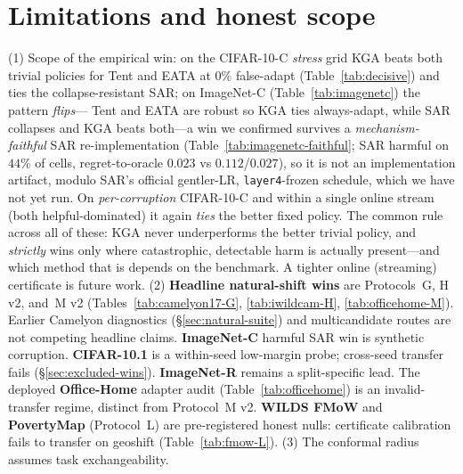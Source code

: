 \documentclass[conference]{IEEEtran}
\theoremstyle{plain}
\theoremstyle{definition}
\begin{document}
\section{Limitations and honest scope}\label{sec:limits}
\begin{center}
\end{center}

\medskip
(1) Scope of the empirical win: on the CIFAR-10-C \emph{stress} grid \textsc{KGA} beats both
trivial policies for Tent and EATA at $0\%$ false-adapt (Table~\ref{tab:decisive}) and ties
the collapse-resistant SAR; on ImageNet-C (Table~\ref{tab:imagenetc}) the pattern \emph{flips}---
Tent and EATA are robust so \textsc{KGA} ties always-adapt, while SAR collapses and \textsc{KGA}
beats both---a win we confirmed survives a \emph{mechanism-faithful} SAR re-implementation
(Table~\ref{tab:imagenetc-faithful}; SAR harmful on $44\%$ of cells, regret-to-oracle $0.023$ vs
$0.112$/$0.027$), so it is not an implementation artifact, modulo SAR's official gentler-LR,
\texttt{layer4}-frozen schedule, which we have not yet run. On \emph{per-corruption} CIFAR-10-C and within a single online stream (both
helpful-dominated) it again \emph{ties} the better fixed policy. The common rule across all of
these: \textsc{KGA} never underperforms the better trivial policy, and \emph{strictly} wins only
where catastrophic, detectable harm is actually present---and which method that is depends on the
benchmark. A tighter online (streaming) certificate is future work.
(2) \textbf{Headline natural-shift wins} are Protocols~G, H v2, and~M v2
(Tables~\ref{tab:camelyon17-G}, \ref{tab:iwildcam-H}, \ref{tab:officehome-M}).
Earlier Camelyon diagnostics (\S\ref{sec:natural-suite}) and multicandidate routes are not
competing headline claims. \textbf{ImageNet-C} harmful SAR win is synthetic corruption.
\textbf{CIFAR-10.1} is a within-seed low-margin probe; cross-seed transfer fails
(\S\ref{sec:excluded-wins}). \textbf{ImageNet-R} remains a split-specific lead. The deployed
\textbf{Office-Home} adapter audit (Table~\ref{tab:officehome}) is an invalid-transfer regime,
distinct from Protocol~M v2.
\textbf{WILDS FMoW} and \textbf{PovertyMap} (Protocol~L) are
pre-registered honest nulls: certificate calibration fails to transfer on geoshift
(Table~\ref{tab:fmow-L}).
(3) The conformal radius assumes task exchangeability.
\end{document}
